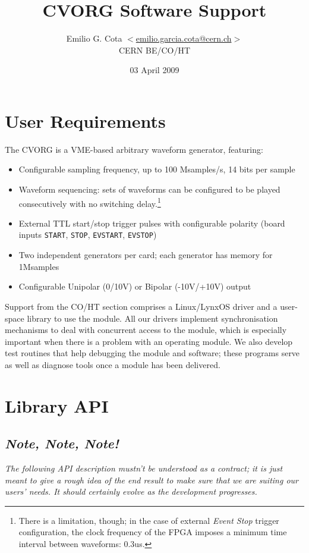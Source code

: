 \documentclass[12pt,a4paper]{article}
\title{CVORG Software Support}
\author{Emilio G. Cota $<$\href{mailto:emilio.garcia.cota@cern.ch}{emilio.garcia.cota@cern.ch}$>$ \\ CERN BE/CO/HT}
\date{03 April 2009}
\begin{document}
\maketitle


\section*{User Requirements}
\label{sec-1}

  The CVORG is a VME-based arbitrary waveform generator, featuring:
\begin{itemize}
\item Configurable sampling frequency, up to 100 Msamples/s, 14 bits per sample
\item Waveform sequencing: sets of waveforms can be configured to be played
    consecutively with no switching delay.\footnote{There is a limitation,
    though; in the case of external \emph{Event Stop} trigger configuration, the
    clock frequency of the FPGA imposes a minimum time interval between
    waveforms: 0.3us. }
\item External TTL start/stop trigger pulses with configurable polarity
    (board inputs \verb~START~, \verb~STOP~, \verb~EVSTART~, \verb~EVSTOP~)
\item Two independent generators per card; each generator has memory for
    1Msamples
\item Configurable Unipolar (0/10V) or Bipolar (-10V/+10V) output
\end{itemize}
  Support from the CO/HT section comprises a Linux/LynxOS driver and a
  user-space library to use the module. All our drivers implement
  synchronisation mechanisms to deal with concurrent access to the module,
  which is especially important when there is a problem with an operating
  module. We also develop test routines that help debugging the module and
  software; these programs serve as well as diagnose tools once a module has
  been delivered.

\section*{Library API}
\label{sec-2}

\subsection*{\emph{Note, Note, Note!}}
\label{sec-2.1}

   \emph{The following API description mustn't be understood as a contract;}
   \emph{it is just meant to give a rough idea of the end result to make sure that}
   \emph{we are suiting our users' needs. It should certainly evolve as the}
   \emph{development progresses.}
\end{document}
